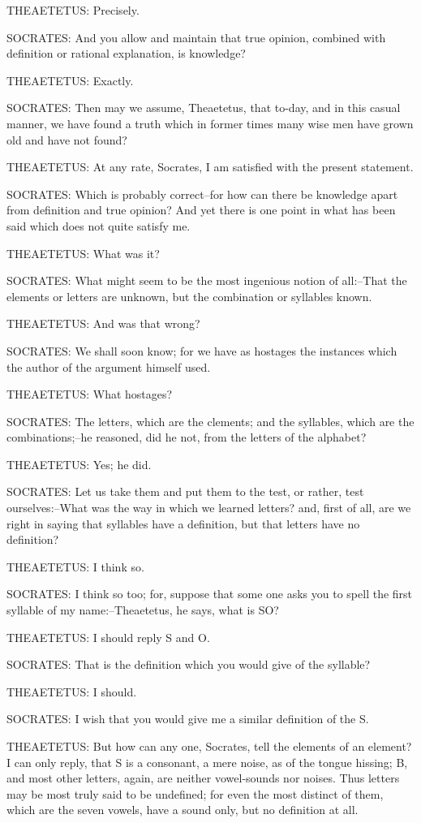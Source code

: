 THEAETETUS: Precisely.

SOCRATES: And you allow and maintain that true opinion, combined with
definition or rational explanation, is knowledge?

THEAETETUS: Exactly.

SOCRATES: Then may we assume, Theaetetus, that to-day, and in this
casual manner, we have found a truth which in former times many wise men
have grown old and have not found?

THEAETETUS: At any rate, Socrates, I am satisfied with the present
statement.

SOCRATES: Which is probably correct--for how can there be knowledge
apart from definition and true opinion? And yet there is one point in
what has been said which does not quite satisfy me.

THEAETETUS: What was it?

SOCRATES: What might seem to be the most ingenious notion of all:--That
the elements or letters are unknown, but the combination or syllables
known.

THEAETETUS: And was that wrong?

SOCRATES: We shall soon know; for we have as hostages the instances
which the author of the argument himself used.

THEAETETUS: What hostages?

SOCRATES: The letters, which are the clements; and the syllables, which
are the combinations;--he reasoned, did he not, from the letters of the
alphabet?

THEAETETUS: Yes; he did.

SOCRATES: Let us take them and put them to the test, or rather, test
ourselves:--What was the way in which we learned letters? and, first of
all, are we right in saying that syllables have a definition, but that
letters have no definition?

THEAETETUS: I think so.

SOCRATES: I think so too; for, suppose that some one asks you to spell
the first syllable of my name:--Theaetetus, he says, what is SO?

THEAETETUS: I should reply S and O.

SOCRATES: That is the definition which you would give of the syllable?

THEAETETUS: I should.

SOCRATES: I wish that you would give me a similar definition of the S.

THEAETETUS: But how can any one, Socrates, tell the elements of an
element? I can only reply, that S is a consonant, a mere noise, as
of the tongue hissing; B, and most other letters, again, are neither
vowel-sounds nor noises. Thus letters may be most truly said to be
undefined; for even the most distinct of them, which are the seven
vowels, have a sound only, but no definition at all.

